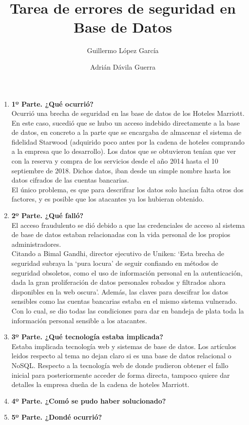 \documentclass{article}
\title{Tarea de errores de seguridad en Base de Datos}
\author{
Guillermo López García
\and
Adrián Dávila Guerra
}
\begin{document}
\maketitle

\begin{enumerate}[label=\alph*]
    \item \textbf{1º Parte. ¿Qué ocurrió?}\\
        Ocurrió una brecha de seguridad en las base de datos de los Hoteles Marriott.
    En este caso, sucedió que se hubo un acceso indebido directamente a la base
    de datos, en concreto a la parte que se encargaba de almacenar el
    sistema de fidelidad Starwood (adquirido poco antes por la cadena de hoteles
    comprando a la empresa que lo desarrollo). Los datos que se obtuvieron tenían
    que ver con la reserva y compra de los servicios desde el año 2014 hasta
    el 10 septiembre de 2018. Dichos datos, iban desde un simple nombre
    hasta los datos cifrados de las cuentas bancarias.\\
    El único problema, es que para descrifrar los datos solo hacían
    falta otros dos factores, y es posible que los atacantes ya los
    hubieran obtenido.
    
    \item \textbf{2º Parte. ¿Qué falló?}\\
        El acceso fraudulento se dió debido a que las credenciales de acceso
    al sistema de base de datos estaban relacionadas con la vida personal
    de los propios administradores.\\
    Citando a Bimal Gandhi, director ejecutivo de Uniken:
    `Esta brecha de seguridad subraya la `pura locura'
    de seguir confiando en métodos de seguridad obsoletos, como el uso de
    información personal en la autenticación, dada la gran proliferación
    de datos personales robados y filtrados ahora disponibles en la web
    oscura'. Además, las claves para descifrar los datos sensibles como
    las cuentas bancarias estaba en el mismo sistema vulnerado.\\
    Con lo cual, se dio todas las condiciones para dar en bandeja de plata
    toda la información personal sensible a los atacantes.
    
    \item \textbf{3º Parte. ¿Qué tecnología estaba implicada?}\\
        Estaba implicada tecnología web y sistemas de base de datos.
    Los artículos leidos respecto al tema no dejan claro si es
    una base de datos relacional o NoSQL\@. Respecto a la tecnología
    web de donde pudieron obtener el fallo inicial para posteriormente
    acceder de forma directa, tampoco quiere dar detalles la empresa
    dueña de la cadena de hoteles Marriott.
    
    \item \textbf{4º Parte. ¿Comó se pudo haber solucionado?}
    
    \item \textbf{5º Parte. ¿Dondé ocurrió?}
\end{enumerate}
\end{document}
